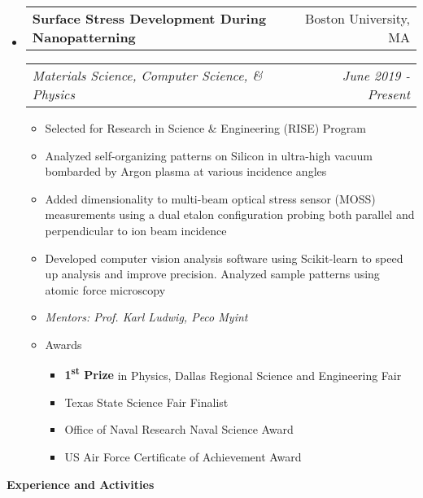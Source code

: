 \documentclass[letterpaper,11pt]{article}
\makeatletter
\newcommand{\resitem}[1]{\item #1 \vspace{-3pt}}
\newcommand{\resheading}[1]{{\large \colorbox{mygrey}{\begin{minipage}{\textwidth}{\textbf{#1 \vphantom{p\^{E}}}}\end{minipage}}}}
\newcommand{\ressubheading}[4]{
	\begin{tabular*}{7.0in}{l@{\extracolsep{\fill}}r}
			#1 & #2 \\
	\end{tabular*}
	\begin{tabular*}{7.0in}{l@{\extracolsep{\fill}}r}
			\textit{#3} & \textit{#4} \\
	\end{tabular*}\vspace{-6pt}}
\makeatother
\begin{document}
\begin{itemize}
\item
	\ressubheading{\textbf{Surface Stress Development During Nanopatterning}}{Boston University, MA}{Materials Science, Computer Science, \& Physics}{June 2019 - Present}
		\begin{itemize}
			\resitem{Selected for Research in Science \& Engineering (RISE) Program}
			\resitem{Analyzed self-organizing patterns on Silicon in ultra-high vacuum bombarded by Argon plasma at various incidence angles}
			\resitem{Added dimensionality to multi-beam optical stress sensor (MOSS) measurements using a dual etalon configuration probing both parallel and perpendicular to ion beam incidence}
			\resitem{Developed computer vision analysis software using Scikit-learn to speed up analysis and improve precision. Analyzed sample patterns using atomic force microscopy}
			\resitem{\textit{Mentors: Prof. Karl Ludwig, Peco Myint}}
			\resitem{Awards}
				\begin{itemize}
					\item[\textbullet] \textbf{1\textsuperscript{st} Prize} in Physics, Dallas Regional Science and Engineering Fair
					\item[\textbullet] Texas State Science Fair Finalist
					\item[\textbullet] Office of Naval Research Naval Science Award
					\item[\textbullet] US Air Force Certificate of Achievement Award
				\end{itemize}\vspace{-6pt}
		\end{itemize}\vspace{-6pt}
\end{itemize}

\vspace{6pt}

\resheading{Experience and Activities}
\end{document}
